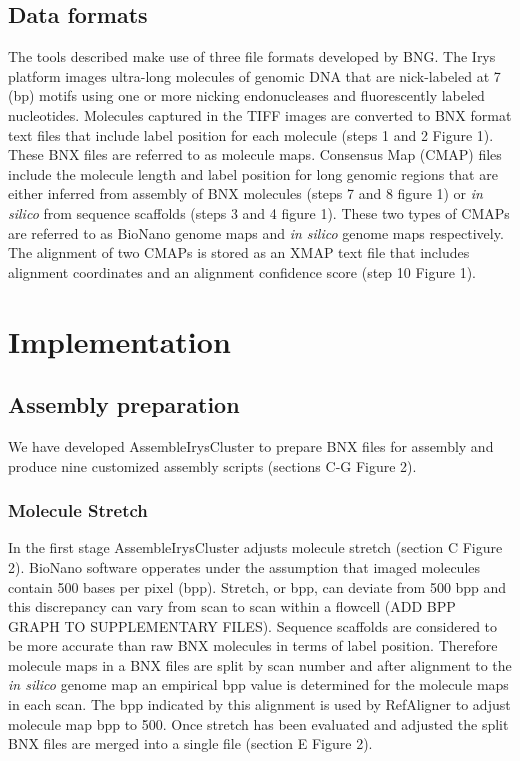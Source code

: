 \documentclass{bmcart}
\begin{document}
\subsection*{Data formats}
The tools described make use of three file formats developed by BNG. The Irys platform images ultra-long molecules of genomic DNA that are nick-labeled at 7 (bp) motifs using one or more nicking endonucleases and fluorescently labeled nucleotides. Molecules captured in the TIFF images are converted to BNX format text files that include label position for each molecule (steps 1 and 2 Figure 1). These BNX files are referred to as molecule maps. Consensus Map (CMAP) files include the molecule length and label position for long genomic regions that are either inferred from assembly of BNX molecules (steps 7 and 8 figure 1) or \textit{in silico} from sequence scaffolds (steps 3 and 4 figure 1). These two types of CMAPs are referred to as BioNano genome maps and \textit{in silico} genome maps respectively. The alignment of two CMAPs is stored as an XMAP text file that includes alignment coordinates and an alignment confidence score (step 10 Figure 1).

\section*{Implementation}
\subsection*{Assembly preparation}
We have developed AssembleIrysCluster to prepare BNX files for assembly and produce nine customized assembly scripts (sections C-G Figure 2).
\subsubsection*{Molecule Stretch}
In the first stage AssembleIrysCluster adjusts molecule stretch (section C Figure 2). BioNano software opperates under the assumption that imaged molecules contain 500 bases per pixel (bpp). Stretch, or bpp, can deviate from 500 bpp and this discrepancy can vary from scan to scan within a flowcell (ADD BPP GRAPH TO SUPPLEMENTARY FILES). Sequence scaffolds are considered to be more accurate than raw BNX molecules in terms of label position. Therefore molecule maps in a BNX files are split by scan number and after alignment to the \textit{in silico} genome map an empirical bpp value is determined for the molecule maps in each scan. The bpp indicated by this alignment is used by RefAligner to adjust molecule map bpp to 500. Once stretch has been evaluated and adjusted the split BNX files are merged into a single file (section E Figure 2).
\end{document}

